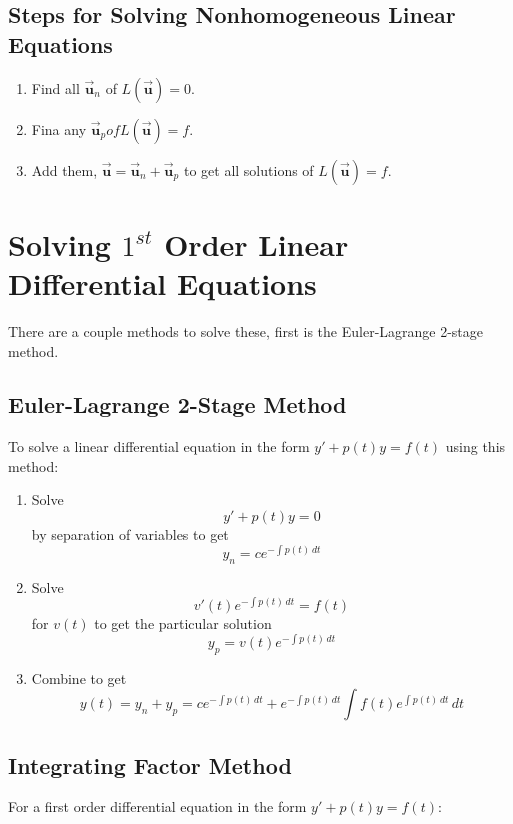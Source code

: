 \documentclass[12pt, landscape, twocolumn]{article}
\let\oldvec\vec
\renewcommand{\vec}[1]{\oldvec{\mathbf{ #1 } } }                    %
\begin{document}
    \subsection{Steps for Solving Nonhomogeneous Linear Equations}
    \begin{enumerate}
    \item Find all $\vec{u}_n$ of $L(\vec{u}) = 0$.
    \item Fina any $\vec{u}_p of L(\vec{u}) = f$.
    \item Add them, $\vec{u} = \vec{u}_n + \vec{u}_p$ to get all solutions of $L(\vec{u}) = f$.
    \end{enumerate}

\section{Solving $1^{st}$ Order Linear Differential Equations}

There are a couple methods to solve these, first is the Euler-Lagrange 2-stage method.

    \subsection{Euler-Lagrange 2-Stage Method}

    To solve a linear differential equation in the form $y\prime + p(t) y = f(t)$ using this method:

    \begin{enumerate}
    \item Solve
        \[
        y\prime + p(t)y = 0
        \]
        by separation of variables to get 
        \[
        y_n = c e^{-\int p(t)\, dt}
        \]
    \item Solve
        \[
        v\prime(t) e^{-\int p(t)\, dt} = f(t)
        \]
        for $v(t)$ to get the particular solution
        \[
        y_p = v(t) e^{-\int p(t)\, dt}
        \]
    \item Combine to get
        \begin{equation}\label{eq:el2sm}
        y(t) = y_n + y_p = c e^{-\int p(t)\, dt} + e^{-\int p(t)\, dt} \int f(t) e^{\int p(t)\, dt} \, dt
        \end{equation}
    \end{enumerate}

    \subsection{Integrating Factor Method}
    For a first order differential equation in the form $y\prime + p(t)y = f(t)$:
\end{document}
